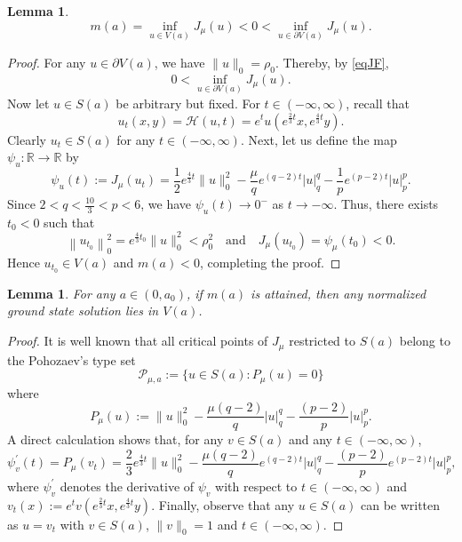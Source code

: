 \documentclass[11pt]{amsart}
\newtheorem{lemma}[theorem]{Lemma}
\numberwithin{equation}{section}
\begin{document}
{{\begin{lemma}
    \begin{equation}\label{eq-m<0}
    m(a)=\inf _{u \in V(a)} J_\mu(u)<0<\inf _{u \in \partial V(a)} J_\mu(u).
    \end{equation}
\end{lemma}	
\begin{proof}
    For any $u \in \partial V(a)$,  we have $\| u\|_{0}=\rho_0$. {Thereby, by \eqref{eqJF}, }
    $$
    0<\inf _{u \in \partial V(a)} J_\mu(u).
    $$
    Now let $u \in {S}(a)$ be arbitrary but fixed. For $t \in(-\infty, \infty)$, recall that
    $$
    u_t(x,y)=\mathcal{H}(u,t)=e^{t}u(e^{\frac{2}{3}t}x,e^{\frac{4}{3}t}y).
    $$
    Clearly $u_t \in {S}(a)$ for any $t \in(-\infty, \infty)$. {Next, let us define the map $\psi_u: \mathbb{R} \to \mathbb{R}$ by}
    $$
    \psi_u(t):=J_\mu\left(u_t\right)=
    \frac{1}{2}e^{\frac{4}{3}t}\|u\|_0^2-\frac{\mu}{q}{e^{(q-2)t}}|u|^q_q-\frac{1}{p}{e^{(p-2)t}}|u|^p_p.
    $$
    Since $2<q<\frac{10}{3}<p<6$, we have { $\psi_u(t) \to 0^{-}$ as $t \to -\infty$}. Thus, there exists $t_0<0$ such that
    \[
    \left\|u_{t_0}\right\|_{0}^2 = e^{\frac{4}{3}t_0} \| u\|_{0}^2 < \rho_0^2 \quad \mbox{and} \quad J_\mu(u_{t_0}) = \psi_\mu(t_0) < 0.
    \]
    {Hence $u_{t_0} \in V(a)$ and $m(a) < 0$, completing the proof.}
\end{proof}
\begin{lemma}\label{Lem4-ground}
    {For any $a \in\left(0, a_0\right)$, if $m(a)$ is attained, then any {normalized ground state solution} lies in $V(a)$.}
\end{lemma}
\begin{proof}
    It is well known that all critical points of $J_\mu$ restricted to $S(a)$ belong to the Pohozaev's type set
    $$
    \mathcal{P}_{\mu,a}:=\{u \in S(a): {P}_{\mu}(u)=0\}
    $$
    where
    $$
    {P}_{\mu}(u):=\|u\|_0^2-\frac{\mu (q-2)}{ q}|u|_q^q-\frac{(p-2)}{p}|u|_p^p.
    $$
    A direct calculation shows that, for any $v \in S(a)$ and any $t \in(-\infty, \infty)$,
    \begin{equation}\label{Eq-psi_v}
        \psi_v^{\prime}(t)={P}_{\mu}\left(v_t\right)=
        \frac{2}{3}e^{\frac{4}{3}t}\|u\|_0^2-
        \frac{\mu (q-2)}{q}e^{(q-2)t}|u|_q^q-\frac{(p-2)}{p}e^{(p-2)t}|u|_p^p,
    \end{equation}
where $\psi_v^{\prime}$ denotes the derivative of $\psi_v$ with respect to $t \in(-\infty, \infty)$ and $ v_t(x):=e^{t}v(e^{\frac{2}{3}t}x,e^{\frac{4}{3}t}y) $. Finally, observe that any $u \in S(a)$ can be written as {$u=v_t$ with $v \in S(a)$, $\|v\|_{0}=1$ and $t \in(-\infty, \infty)$.}


\end{proof}}}
\end{document}
